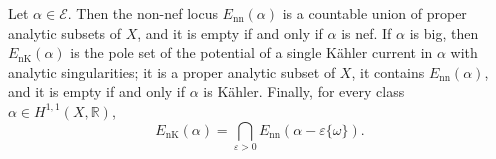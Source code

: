 \begin{theorem}\label{thm:positivity-loci}
Let $\alpha\in\mathcal E$. Then the non-nef locus $E_{\mathrm{nn}}(\alpha)$ is a countable union of proper analytic subsets of $X$, and it is empty if and only if $\alpha$ is nef. If $\alpha$ is big, then $E_{\mathrm{nK}}(\alpha)$ is the pole set of the potential of a single K\"ahler current in $\alpha$ with analytic singularities; it is a proper analytic subset of $X$, it contains $E_{\mathrm{nn}}(\alpha)$, and it is empty if and only if $\alpha$ is K\"ahler. Finally, for every class $\alpha\in H^{1,1}(X,\mathbb R)$,
\begin{equation}\label{eq:non-kahler-non-nef-allowance}
 E_{\mathrm{nK}}(\alpha)=
       \bigcap_{\varepsilon>0}E_{\mathrm{nn}}(\alpha-\varepsilon\{\omega\}).
\end{equation}
\end{theorem}
